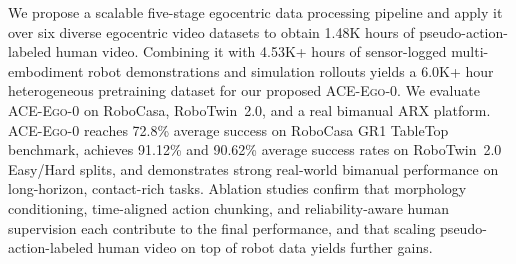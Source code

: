 \documentclass{llmxive}
\providecommand{\OURS}{\textsc{ACE-Ego-0}\xspace}
\providecommand{\Ours}{\OURS}
\begin{document}

We propose a scalable five-stage egocentric data processing pipeline and apply it over six diverse egocentric video datasets to obtain 1.48K hours of pseudo-action-labeled human video. Combining it with 4.53K+ hours of sensor-logged multi-embodiment robot demonstrations and simulation rollouts yields a 6.0K+ hour heterogeneous pretraining dataset for our proposed \Ours. We evaluate \Ours on RoboCasa, RoboTwin~2.0, and a real bimanual ARX platform. \Ours reaches 72.8\% average success on RoboCasa GR1 TableTop benchmark, achieves 91.12\% and 90.62\% average success rates on RoboTwin~2.0 Easy/Hard splits, and demonstrates strong real-world bimanual performance on long-horizon, contact-rich tasks. Ablation studies confirm that morphology conditioning, time-aligned action chunking, and reliability-aware human supervision each contribute to the final performance, and that scaling pseudo-action-labeled human video on top of robot data yields further gains.
\end{document}
